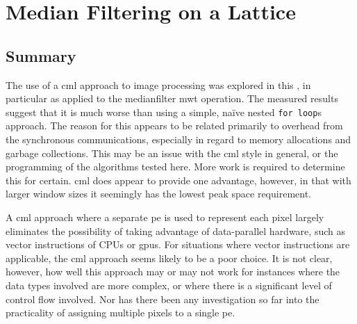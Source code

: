 \newcommand{\hopac}{Hopac}
\chapter{\label{chap:median}Median Filtering on a Lattice}





\section{Summary}
The use of a \gls{cml} approach to image processing was explored in this , in particular as applied to the \gls{medianfilter} \gls{mwt} operation.  The measured results suggest that it is much worse than using a simple, naïve nested \texttt{for loop}s approach.  The reason for this appears to be related primarily to overhead from the synchronous communications, especially in regard to memory allocations and garbage collections.  This may be an issue with the \gls{cml} style in general,  or the programming of the algorithms tested here.  More work is required to determine this for certain.  \Gls{cml} does appear to provide one advantage, however, in that with larger window sizes it seemingly has the lowest peak space requirement.

A \gls{cml} approach where a separate \gls{pe} is used to represent each pixel largely eliminates the possibility of taking advantage of data-parallel hardware, such as vector instructions of CPUs or \glspl{gpu}.  For situations where vector instructions are applicable, the \gls{cml} approach seems likely to be a poor choice.  It is not clear, however, how well this approach may or may not work for instances where the data types involved are more complex, or where there is a significant level of control flow involved.  Nor has there been any investigation so far into the practicality of assigning multiple pixels to a single \gls{pe}.

